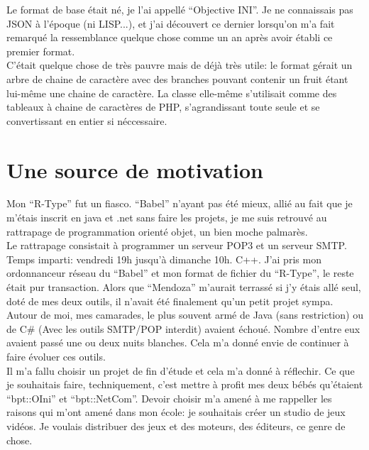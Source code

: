 \documentclass[a5paper, 12pt]{book}
\begin{document}
Le format de base était né, je l'ai appellé ``Objective INI''.
Je ne connaissais pas JSON à l'époque (ni LISP...), et j'ai découvert ce
dernier lorsqu'on m'a fait remarqué la ressemblance quelque
chose comme un an après avoir établi ce premier format.\\

C'était quelque chose de très pauvre mais de déjà très utile:
le format gérait un arbre de chaine de caractère avec des
branches pouvant contenir un fruit étant lui-même une chaine
de caractère. La classe elle-même s'utilisait comme des
tableaux à chaine de caractères de PHP, s'agrandissant toute
seule et se convertissant en entier si néccessaire.\\

\newpage

\section{Une source de motivation}

Mon ``R-Type'' fut un fiasco. ``Babel'' n'ayant pas
été mieux, allié au fait que je m'étais inscrit en java et .net
sans faire les projets, je me suis retrouvé au rattrapage
de programmation orienté objet, un bien moche palmarès.\\

Le rattrapage consistait à programmer un serveur POP3 et un
serveur SMTP. Temps imparti: vendredi 19h jusqu'à dimanche 10h.
C++. J'ai pris mon ordonnanceur réseau du ``Babel'' et
mon format de fichier du ``R-Type'', le reste était pur
transaction. Alors que ``Mendoza'' m'aurait terrassé si j'y
étais allé seul, doté de mes deux outils, il n'avait été
finalement qu'un petit projet sympa.\\

Autour de moi, mes camarades, le plus souvent armé de Java
(sans restriction) ou de C\# (Avec les outils SMTP/POP interdit)
avaient échoué. Nombre d'entre eux avaient passé une ou deux
nuits blanches. Cela m'a donné envie de continuer à faire
évoluer ces outils.\\

Il m'a fallu choisir un projet de fin d'étude et cela m'a
donné à réflechir. Ce que je souhaitais faire, techniquement,
c'est mettre à profit mes deux bébés qu'étaient ``bpt::OIni'' et
``bpt::NetCom''. Devoir choisir m'a amené à me rappeller
les raisons qui m'ont amené dans mon école: je souhaitais
créer un studio de jeux vidéos. Je voulais distribuer des jeux
et des moteurs, des éditeurs, ce genre de chose.\\
\end{document}
